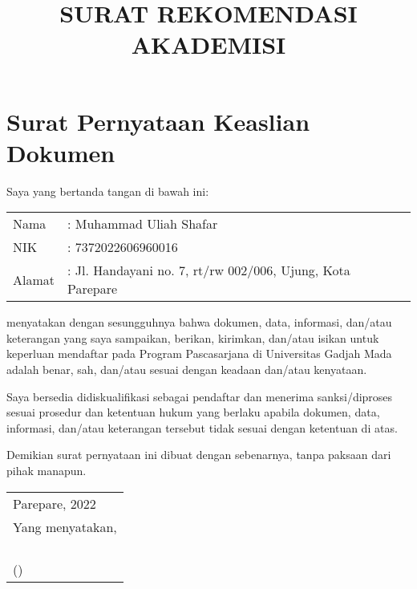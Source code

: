 \documentclass[12pt]{article}
\title{\vspace{-4ex}SURAT REKOMENDASI AKADEMISI}
\author{}
\date{\vspace{-6ex}}
\newcommand\fillin[1][3cm]{\makebox[#1]{\dotfill}}
\begin{document}
\section{Surat Pernyataan Keaslian Dokumen}

Saya yang bertanda tangan di bawah ini:

\begin{table}[htpb]
\renewcommand{\arraystretch}{1.25}
    \begin{tabular}{p{4cm}l}
Nama & : Muhammad Uliah Shafar\\
NIK & : 7372022606960016\\
Alamat & : Jl. Handayani no. 7, rt/rw 002/006, Ujung, Kota Parepare\\
    \end{tabular}
\end{table}

menyatakan dengan sesungguhnya bahwa dokumen, data, informasi, dan/atau keterangan yang saya sampaikan, berikan, kirimkan, dan/atau isikan untuk keperluan mendaftar pada Program Pascasarjana di Universitas Gadjah Mada adalah benar, sah, dan/atau sesuai dengan keadaan dan/atau kenyataan.

Saya bersedia didiskualifikasi sebagai pendaftar dan menerima sanksi/diproses sesuai prosedur dan ketentuan hukum yang berlaku apabila dokumen, data, informasi, dan/atau keterangan tersebut tidak sesuai dengan ketentuan di atas.

Demikian surat pernyataan ini dibuat dengan sebenarnya, tanpa paksaan dari pihak manapun.
\vspace{\baselineskip}

{\raggedleft
\begin{tabular}{l@{}}
Parepare, \fillin[3cm] 2022 \\
Yang menyatakan, \\
\\
\\
\\
\\
(\fillin[6cm])\\
\end{tabular}\par}
\end{document}
